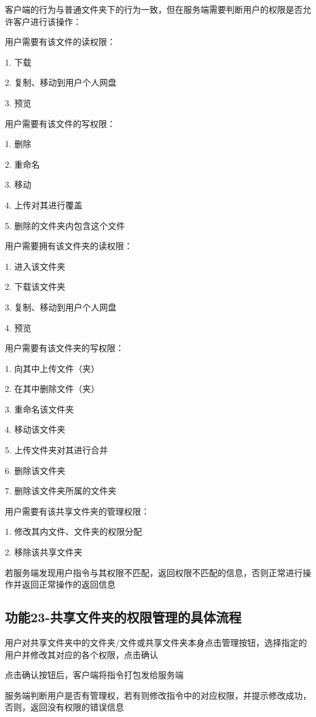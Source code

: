 客户端的行为与普通文件夹下的行为一致，但在服务端需要判断用户的权限是否允许客户进行该操作：

用户需要有该文件的读权限：

1. 下载

2. 复制、移动到用户个人网盘

3. 预览

用户需要有该文件的写权限：

1. 删除

2. 重命名

3. 移动

4. 上传对其进行覆盖

5. 删除的文件夹内包含这个文件

用户需要拥有该文件夹的读权限：

1. 进入该文件夹

2. 下载该文件夹

3. 复制、移动到用户个人网盘

4. 预览

用户需要有该文件夹的写权限：

1. 向其中上传文件（夹）

2. 在其中删除文件（夹）

3. 重命名该文件夹

4. 移动该文件夹

5. 上传文件夹对其进行合并

6. 删除该文件夹

7. 删除该文件夹所属的文件夹

用户需要有该共享文件夹的管理权限：

1. 修改其内文件、文件夹的权限分配

2. 移除该共享文件夹

若服务端发现用户指令与其权限不匹配，返回权限不匹配的信息，否则正常进行操作并返回正常操作的返回信息

\subsection{功能23-共享文件夹的权限管理的具体流程}

用户对共享文件夹中的文件夹/文件或共享文件夹本身点击管理按钮，选择指定的用户并修改其对应的各个权限，点击确认

点击确认按钮后，客户端将指令打包发给服务端

服务端判断用户是否有管理权，若有则修改指令中的对应权限，并提示修改成功，否则，返回没有权限的错误信息

